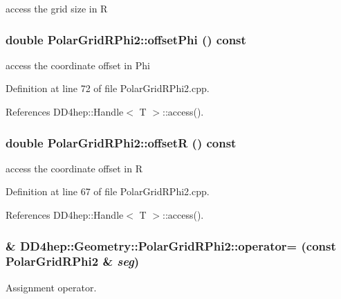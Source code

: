 access the grid size in R \hypertarget{class_d_d4hep_1_1_geometry_1_1_polar_grid_r_phi2_ad7c97a5a97fad06114de10cf6d1946e7}{
\subsubsection[{offsetPhi}]{\setlength{\rightskip}{0pt plus 5cm}double PolarGridRPhi2::offsetPhi () const}}
\label{class_d_d4hep_1_1_geometry_1_1_polar_grid_r_phi2_ad7c97a5a97fad06114de10cf6d1946e7}


access the coordinate offset in Phi 

Definition at line 72 of file PolarGridRPhi2.cpp.

References DD4hep::Handle$<$ T $>$::access().\hypertarget{class_d_d4hep_1_1_geometry_1_1_polar_grid_r_phi2_a06d0e8a37a14fa5ac7befaa5d42e0999}{
\subsubsection[{offsetR}]{\setlength{\rightskip}{0pt plus 5cm}double PolarGridRPhi2::offsetR () const}}
\label{class_d_d4hep_1_1_geometry_1_1_polar_grid_r_phi2_a06d0e8a37a14fa5ac7befaa5d42e0999}


access the coordinate offset in R 

Definition at line 67 of file PolarGridRPhi2.cpp.

References DD4hep::Handle$<$ T $>$::access().\hypertarget{class_d_d4hep_1_1_geometry_1_1_polar_grid_r_phi2_a46530db9beff3425dccd34bc60e9c7db}{
\subsubsection[{operator=}]{\& DD4hep::Geometry::PolarGridRPhi2::operator= (const {\bf PolarGridRPhi2} \& {\em seg})}}
\label{class_d_d4hep_1_1_geometry_1_1_polar_grid_r_phi2_a46530db9beff3425dccd34bc60e9c7db}


Assignment operator. 

